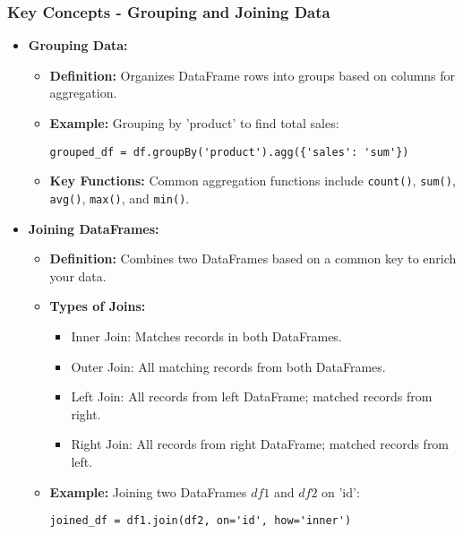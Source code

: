 \documentclass[aspectratio=169]{beamer}
\begin{document}
\begin{frame}[fragile]
    \frametitle{Key Concepts - Grouping and Joining Data}
    \begin{itemize}
        \item \textbf{Grouping Data:}
        \begin{itemize}
            \item \textbf{Definition:} Organizes DataFrame rows into groups based on columns for aggregation.
            \item \textbf{Example:} Grouping by 'product' to find total sales:
            \begin{lstlisting}
grouped_df = df.groupBy('product').agg({'sales': 'sum'})
            \end{lstlisting}
            \item \textbf{Key Functions:} Common aggregation functions include \texttt{count()}, \texttt{sum()}, \texttt{avg()}, \texttt{max()}, and \texttt{min()}.
        \end{itemize}
        
        \item \textbf{Joining DataFrames:}
        \begin{itemize}
            \item \textbf{Definition:} Combines two DataFrames based on a common key to enrich your data.
            \item \textbf{Types of Joins:}
            \begin{itemize}
                \item Inner Join: Matches records in both DataFrames.
                \item Outer Join: All matching records from both DataFrames.
                \item Left Join: All records from left DataFrame; matched records from right.
                \item Right Join: All records from right DataFrame; matched records from left.
            \end{itemize}
            \item \textbf{Example:} Joining two DataFrames $df1$ and $df2$ on 'id':
            \begin{lstlisting}
joined_df = df1.join(df2, on='id', how='inner')
            \end{lstlisting}
        \end{itemize}
    \end{itemize}
\end{frame}
\end{document}
